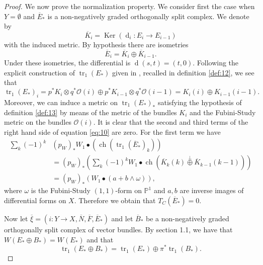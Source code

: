 \documentclass[10pt,twoside]{article}
\numberwithin{equation}{section}
\theoremstyle{plain}
\theoremstyle{definition}
\DeclareMathOperator{\tr}{tr}
\DeclareMathOperator{\dd}{d}
\DeclareMathOperator{\ch}{ch}
\DeclareMathOperator{\Ker}{Ker}
\begin{document}
\begin{proof}
  We now prove the normalization property. We consider first the case
  when $Y=\emptyset$ and $\overline E_{\ast}$ is a non-negatively graded
  orthogonally split complex. We denote by
  \begin{displaymath}
    \overline K_{i}=\Ker(\dd_{i}\colon E_{i}\longrightarrow E_{i-1})
  \end{displaymath}
  with the induced metric. By hypothesis there are isometries
  \begin{displaymath}
    \overline E_{i}=\overline K_{i}\oplus \overline K_{i-1}.
  \end{displaymath}
  Under these isometries, the differential is
  $\dd(s,t)=(t,0)$. Following the explicit construction of
  $\tr_{1}(E_{\ast})$ given in \cite{GilletSoule:aRRt}, recalled in definition
  \ref{def:12}, we see that
  \begin{displaymath}
    \tr_{1}(E_{\ast})_{i}=p^{\ast}K_{i}\otimes q^{\ast}\mathcal{O}(i)
    \oplus p^{\ast}K_{i-1}\otimes q^{\ast}\mathcal{O}(i-1)=
    K_{i}(i)
    \oplus K_{i-1}(i-1).
  \end{displaymath}
  Moreover, we can induce a metric on $ \tr_{1}(E_{\ast})_{\ast}$ satisfying
  the hypothesis of definition \ref{def:13} by means of
  the metric of the bundles $K_{i}$ and the Fubini-Study metric on the
  bundles $\mathcal{O}(i)$. It is clear that the second and third
  terms of the right hand side of equation \eqref{eq:10} are zero. For
  the first term we have
  \begin{align*}
    \sum_{k}(-1)^{k}&(p_{W})_{\ast}W_{1} \bullet 
    \left(\ch(\tr_{1}(\overline E_{\ast})_{k})
    \right)\\
    &=
    (p_{W})_{\ast}
    \left(\sum_{k}(-1)^{k}W_{1} \bullet \ch(\overline
      K_{k}(k)\overset{\perp}{\oplus}\overline K_{k-1}(k-1)) 
    \right)\\
    &=(p_{W})_{\ast}
    \left(W_{1} \bullet (a+b\land \omega ) 
    \right),
  \end{align*}
  where $\omega $ is the Fubini-Study $(1,1)$-form on $\mathbb{P}^{1}$
  and $a,b$ are inverse images of differential forms on $X$. Therefore
  we obtain that 
  $T_{C}(\overline E_{\ast})=0$. 

  Now let $\overline \xi=(i\colon Y\longrightarrow X,\overline N,
  \overline F, \overline 
  E_{\ast})$ and let $\overline B_{\ast}$ be a non-negatively graded orthogonally
  split complex 
  of vector bundles. By \cite{GilletSoule:aRRt} section 1.1, we have
  that $W(E_{\ast}\oplus B_{\ast})=W(E_{\ast})$ and that
  \begin{displaymath}
    \tr_{1}(E_{\ast}\oplus B_{\ast})= \tr_{1}(E_{\ast})\oplus \pi
    ^{\ast} \tr_{1}(B_{\ast}).
  \end{displaymath}


\end{proof}
\end{document}
